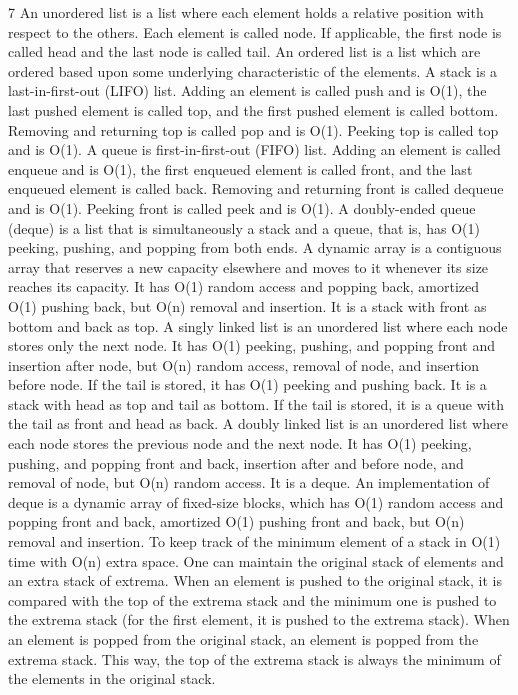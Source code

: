 \documentclass[a4paper,10pt]{extarticle}
\begin{document}
\begin{multicols}{7}
An unordered list is a list where each element holds a relative position with respect to the others. Each element is called node. If applicable, the first node is called head and the last node is called tail.
An ordered list is a list which are ordered based upon some underlying characteristic of the elements.
A stack is a last-in-first-out (LIFO) list. Adding an element is called push and is O(1), the last pushed element is called top, and the first pushed element is called bottom. Removing and returning top is called pop and is O(1). Peeking top is called top and is O(1).
A queue is first-in-first-out (FIFO) list. Adding an element is called enqueue and is O(1), the first enqueued element is called front, and the last enqueued element is called back. Removing and returning front is called dequeue and is O(1). Peeking front is called peek and is O(1).
A doubly-ended queue (deque) is a list that is simultaneously a stack and a queue, that is, has O(1) peeking, pushing, and popping from both ends.
A dynamic array is a contiguous array that reserves a new capacity elsewhere and moves to it whenever its size reaches its capacity. It has O(1) random access and popping back, amortized O(1) pushing back, but O(n) removal and insertion. It is a stack with front as bottom and back as top.
A singly linked list is an unordered list where each node stores only the next node. It has O(1) peeking, pushing, and popping front and insertion after node, but O(n) random access, removal of node, and insertion before node. If the tail is stored, it has O(1) peeking and pushing back. It is a stack with head as top and tail as bottom. If the tail is stored, it is a queue with the tail as front and head as back.
A doubly linked list is an unordered list where each node stores the previous node and the next node. It has O(1) peeking, pushing, and popping front and back, insertion after and before node, and removal of node, but O(n) random access. It is a deque.
An implementation of deque is a dynamic array of fixed-size blocks, which has O(1) random access and popping front and back, amortized O(1) pushing front and back, but O(n) removal and insertion.
To keep track of the minimum element of a stack in O(1) time with O(n) extra space. One can maintain the original stack of elements and an extra stack of extrema. When an element is pushed to the original stack, it is compared with the top of the extrema stack and the minimum one is pushed to the extrema stack (for the first element, it is pushed to the extrema stack). When an element is popped from the original stack, an element is popped from the extrema stack. This way, the top of the extrema stack is always the minimum of the elements in the original stack.










\end{multicols}
\end{document}
